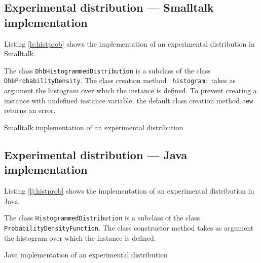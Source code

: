 \documentclass[twoside]{book}
\begin{document}
\subsection{Experimental distribution --- Smalltalk  implementation}
Listing \ref{ls:histprob} shows the implementation of an
experimental distribution in Smalltalk.

The class {\tt DhbHistogrammedDistribution} is a subclass of the
class {\tt DhbProbabilityDensity}. The class creation method {\tt
histogram:} takes as argument the histogram over which the
instance is defined. To prevent creating a instance with undefined
instance variable, the default class creation method {\tt new}
returns an error.

\begin{listing} Smalltalk implementation of an experimental distribution \label{ls:histprob}

\end{listing}

\subsection{Experimental distribution --- Java  implementation}
Listing \ref{lj:histprob} shows the implementation of an
experimental distribution in Java.

The class {\tt HistogrammedDistribution} is a subclass of the
class {\tt ProbabilityDensityFunction}. The class constructor
method takes as argument the histogram over which the instance is
defined.

\begin{listing} Java implementation of an experimental distribution \label{lj:histprob}

\end{listing}


\ifx\wholebook\relax\else
\end{document}
